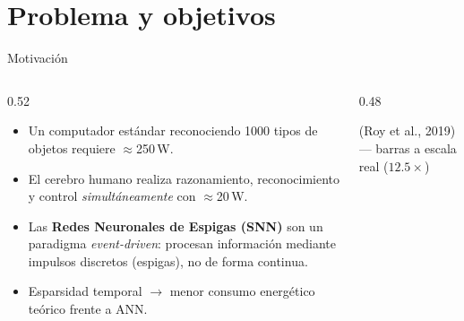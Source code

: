 \documentclass[aspectratio=169,10pt]{beamer}
\begin{document}
\section{Problema y objetivos}
\begin{frame}{Motivación}
  \begin{columns}[T]
    \begin{column}{0.52\textwidth}
      \begin{itemize}
        \item Un computador estándar reconociendo 1000 tipos de objetos requiere \alert{$\approx$250\,W}.
        \item El cerebro humano realiza razonamiento, reconocimiento y control \emph{simultáneamente} con $\approx$\alert{20\,W}.
        \item Las \textbf{Redes Neuronales de Espigas (SNN)} son un paradigma \emph{event-driven}: procesan información mediante impulsos discretos (espigas), no de forma continua.
        \item Esparsidad temporal $\rightarrow$ menor consumo energético teórico frente a ANN.
      \end{itemize}
    \end{column}
    \begin{column}{0.48\textwidth}
      \begin{center}
      \end{center}
      \small\centering (Roy et al., 2019) --- barras a escala real ($12.5\times$)
    \end{column}
  \end{columns}
\end{frame}
\end{document}
